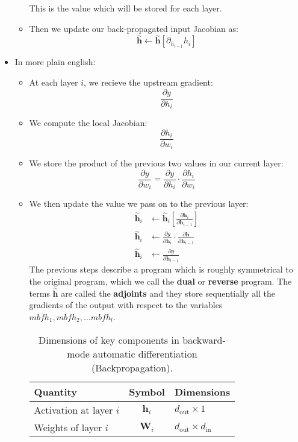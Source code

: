 \documentclass{article}
\newcommand{\tbf}[1]{\textbf{#1}}
\newcommand{\mbf}[1]{\mathbf{#1}}
\begin{document}
\begin{itemize}
\begin{itemize}
        This is the value which will be stored for each layer. 
        \item Then we update our back-propagated input Jacobian as:
        \[\overset{\sim}{\mbf{h}} \leftarrow \overset{\sim}{\mbf{h}} \left[ \partial_{h_{i-1}} h_i \right]\]
    \end{itemize}
    \item In more plain english:
    \begin{itemize}
        \item At each layer $i$, we recieve the upstream gradient:
        \[ \frac{\partial y}{\partial h_{i}} \]
        \item We compute the local Jacobian: 
        \[ \frac{\partial h_{i}}{\partial w_{i}} \]
        \item We store the product of the previous two values in our current layer: 
        \[\frac{\partial y}{\partial w_i} = \frac{\partial y}{\partial h_i} \cdot \frac{\partial h_i}{\partial w_i}\]
        \item We then update the value we pass on to the previous layer:
        \begin{align*}
            \overset{\sim}{\mbf{h}}_i &\leftarrow \overset{\sim}{\mbf{h}}_i \left[ \frac{\partial \mbf{h}_i}{\partial \mbf{h}_{i-1}} \right] \\
            \overset{\sim}{\mbf{h}}_i &\leftarrow \frac{\partial y}{\partial \mbf{h}_i} \cdot \frac{\partial \mbf{h}}{\partial \mbf{h}_{i-1}} \\
            \overset{\sim}{\mbf{h}}_i &\leftarrow \frac{\partial y}{\partial \mbf{h}_{i-1}} 
        \end{align*}
        The previous steps describe a program which is roughly symmetrical to the original program, which we call the \tbf{dual} or \tbf{reverse} program.
        The terms $\overset{\sim}{\mbf{h}}$ are called the \tbf{adjoints} and they store sequentially all the gradients of the output with respect to the variables $mbf{h}_1, mbf{h}_2, \hdots mbf{h}_l$.
        \begin{table}[H]
\caption{Dimensions of key components in backward-mode automatic differentiation (Backpropagation).}
\centering
\renewcommand{\arraystretch}{1.3}
\begin{tabular}{l c l}
\textbf{Quantity} & \textbf{Symbol} & \textbf{Dimensions} \\
\hline
Activation at layer $i$        & $\mathbf{h}_i$                         & $d_{\text{out}} \times 1$ \\
Weights of layer $i$           & $\mathbf{W}_i$                         & $d_{\text{out}} \times d_{\text{in}}$ \\

\end{tabular}
\end{table}
\end{itemize}
\end{itemize}
\end{document}
